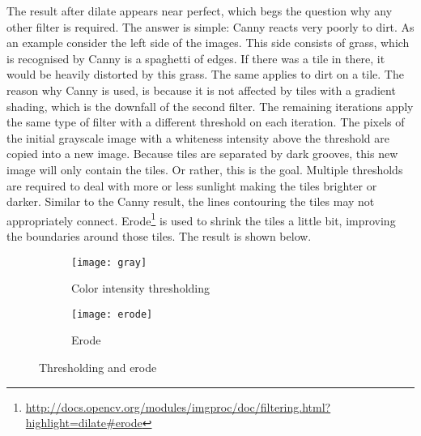 The result after dilate appears near perfect, which begs the question why any other filter is required. The answer is simple: Canny reacts very poorly to dirt. As an example consider the left side of the images. This side consists of grass, which is recognised by Canny is a spaghetti of edges. If there was a tile in there, it would be heavily distorted by this grass. The same applies to dirt on a tile. The reason why Canny is used, is because it is not affected by tiles with a gradient shading, which is the downfall of the second filter.
\npar
The remaining iterations apply the same type of filter with a different threshold on each iteration. The pixels of the initial grayscale image with a whiteness intensity above the threshold are copied into a new image. Because tiles are separated by dark grooves, this new image will only contain the tiles. Or rather, this is the goal. Multiple thresholds are required to deal with more or less sunlight making the tiles brighter or darker. Similar to the Canny result, the lines contouring the tiles may not appropriately connect. Erode\footnote{\url{http://docs.opencv.org/modules/imgproc/doc/filtering.html?highlight=dilate\#erode}} is used to shrink the tiles a little bit, improving the boundaries around those tiles. The result is shown below.

\begin{figure}[ht]
\centering
\begin{subfigure}{.5\textwidth}
  \centering
  \texttt{[image: gray]}
  \caption{Color intensity thresholding\label{gray}}
\end{subfigure}%
\begin{subfigure}{.5\textwidth}
  \centering
  \texttt{[image: erode]}
  \caption{Erode\label{erode}}
\end{subfigure}
\caption{Thresholding and erode\label{gray_erode}}
\end{figure}


